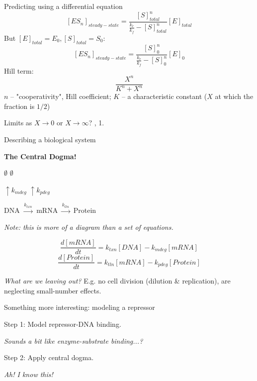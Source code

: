 \documentclass[handout]{beamer} %
\begin{document}
\begin{frame}{Predicting using a differential equation}
	$$ [ES_n]_{steady-state} = \frac{[S]_{total}^n}{\frac{k_r}{k_f} - [S]_{total}^n} [E]_{total} $$
	But $[E]_{total} = E_0, [S]_{total} = S_0$: \pause
	$$ [ES_n]_{steady-state} = \frac{[S]_0^n}{\frac{k_r}{k_f} - [S]_0^n} [E]_0 $$
	\pause
	Hill term: $$ \boxed{\frac{X^n}{K^n + X^n}} $$
	\pause
	$n$ -- "cooperativity", Hill coefficient; $K$ -- a characteristic constant ($X$ at which the fraction is $1/2$)

	\pause
	Limits as $X \rightarrow 0$ or $X \rightarrow \infty$? , 1.
\end{frame}

\begin{frame}{Describing a biological system}

\pause

\textbf{The Central Dogma!} \pause

\vspace{5 mm}

\hspace{27 mm} \hspace{21 mm} $\emptyset$ \hspace{15 mm} $\emptyset$

\hspace{27 mm} \hspace{21 mm} $\uparrow k_{mdeg}$ \hspace{5 mm} $\uparrow k_{pdeg}$ 

\hspace{27 mm} DNA $\xrightarrow{k_{txn}}$ mRNA $\xrightarrow{k_{tln}}$ Protein

\pause

\emph{Note: this is more of a diagram than a set of equations.}

\pause

\vspace{2 mm}

$$ \frac{d[mRNA]}{dt} = k_{txn}[DNA] - k_{mdeg}[mRNA] $$
$$ \frac{d[Protein]}{dt} = k_{tln}[mRNA] - k_{pdeg}[Protein] $$

\pause

\vspace{5 mm}

\emph{What are we leaving out?} \pause E.g. no cell division (dilution \& replication), are neglecting small-number effects.

\end{frame}

\begin{frame}{Something more interesting: modeling a repressor}

Step 1: Model repressor-DNA binding.

\emph{Sounds a bit like enzyme-substrate binding...?}

\vspace{2 mm}

Step 2: Apply central dogma.

\emph{Ah! I know this!}

\end{frame}
\end{document}
